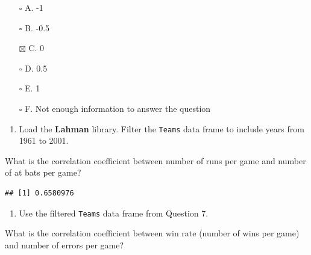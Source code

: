 \documentclass[
]{article}
\newenvironment{Shaded}{\begin{snugshade}}{\end{snugshade}}
\newcommand{\DecValTok}[1]{\textcolor[rgb]{0.00,0.00,0.81}{#1}}
\newcommand{\KeywordTok}[1]{\textcolor[rgb]{0.13,0.29,0.53}{\textbf{#1}}}
\newcommand{\NormalTok}[1]{#1}
\newcommand{\OperatorTok}[1]{\textcolor[rgb]{0.81,0.36,0.00}{\textbf{#1}}}
\newcommand{\StringTok}[1]{\textcolor[rgb]{0.31,0.60,0.02}{#1}}
\providecommand{\tightlist}{%
  \setlength{\itemsep}{0pt}\setlength{\parskip}{0pt}}
\begin{document}
\begin{itemize}
\tightlist
\item[$\square$]
  A. -1
\item[$\square$]
  B. -0.5
\item[$\boxtimes$]
  C. 0
\item[$\square$]
  D. 0.5
\item[$\square$]
  E. 1
\item[$\square$]
  F. Not enough information to answer the question
\end{itemize}

\begin{enumerate}
\def\labelenumi{\arabic{enumi}.}
\setcounter{enumi}{6}
\tightlist
\item
  Load the \textbf{Lahman} library. Filter the \texttt{Teams} data frame
  to include years from 1961 to 2001.
\end{enumerate}

What is the correlation coefficient between number of runs per game and
number of at bats per game?

\begin{Shaded}
\end{Shaded}

\begin{verbatim}
## [1] 0.6580976
\end{verbatim}

\begin{enumerate}
\def\labelenumi{\arabic{enumi}.}
\setcounter{enumi}{7}
\tightlist
\item
  Use the filtered \texttt{Teams} data frame from Question 7.
\end{enumerate}

What is the correlation coefficient between win rate (number of wins per
game) and number of errors per game?

\begin{Shaded}
\end{Shaded}
\end{document}
